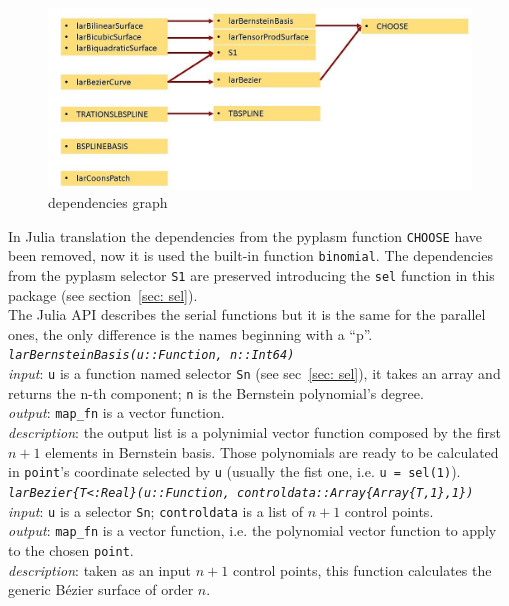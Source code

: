 \documentclass[a4paper,11pt]{article}
\begin{document}
\begin{figure}[h]
\centering
\includegraphics[scale=0.50]{grafofinale.jpg}
\caption{dependencies graph}
\end{figure}

In Julia translation the dependencies from the pyplasm function \texttt{CHOOSE} have been removed, now it is used the built-in function \texttt{binomial}.
The dependencies from the pyplasm selector \texttt{S1} are preserved introducing the \texttt{sel} function in this package (see section~\ref{sec: sel}). \\
The Julia API describes the serial functions but it is the same for the parallel ones, the only difference is the names beginning with a ``p''. \\

\emph{\texttt{larBernsteinBasis(u::Function, n::Int64)}} \\
\emph{input}: \texttt{u} is a function named selector \texttt{Sn} (see sec~\ref{sec: sel}), it takes an array and returns the n-th component; \texttt{n} is the Bernstein polynomial's degree. \\
\emph{output}:  \texttt{map\_fn} is a vector function. \\
\emph{description}: the output list is a polynimial vector function composed by the first $n+1$ elements in Bernstein basis. Those polynomials are ready to be calculated in \texttt{point}'s coordinate selected by \texttt{u} (usually the fist one, i.e. \texttt{u = sel(1)}). \\

\emph{\texttt{larBezier\{T<:Real\}(u::Function, controldata::Array\{Array\{T,1\},1\})}} \\
\emph{input}: \texttt{u} is a selector \texttt{Sn}; \texttt{controldata} is a list of $n+1$ control points. \\
\emph{output}:  \texttt{map\_fn} is a vector function, i.e. the polynomial vector function to apply to the chosen \texttt{point}. \\
\emph{description}: taken as an input $n+1$ control points, this function calculates the generic B\'ezier surface of order $n$.  \\
\end{document}
